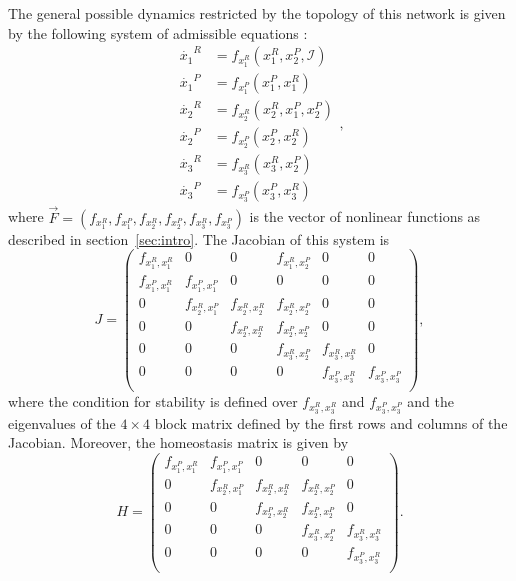 The general possible dynamics restricted by
the topology of this network is given by the following system of 
admissible equations \cite{martin_ian_groupoids2006}:
\begin{equation}
    \begin{aligned}
        \dot{x_1}^R &= f_{x_1^R}(x_1^R, x_2^P, \mathcal{I})\\
        \dot{x_1}^P &= f_{x_1^P}(x_1^P, x_1^R)\\
        \dot{x_2}^R &= f_{x_2^R}(x_2^R, x_1^P, x_2^P)\\
        \dot{x_2}^P &= f_{x_2^P}(x_2^P, x_2^R)\\
        \dot{x_3}^R &= f_{x_3^R}(x_3^R, x_2^P)\\
        \dot{x_3}^P &= f_{x_3^P}(x_3^P, x_3^R)
    \end{aligned},
\end{equation} 
where $\vec{F} = (f_{x_1^R}, f_{x_1^P}, f_{x_2^R}, f_{x_2^P}, 
f_{x_3^R}, f_{x_3^P})$ is 
the vector of nonlinear functions as described in 
section~\ref{sec:intro}. The Jacobian of this system is 
\begin{equation}
    J = 
    \begin{pmatrix}
        f_{x_1^R,x_1^R} & 0 & 0 & f_{x_1^R, x_2^P} & 0 & 0 \\
        f_{x_1^P,x_1^R} & f_{x_1^P,x_1^P} & 0 & 0 & 0 & 0 \\
        0 & f_{x_2^R,x_1^P} & f_{x_2^R,x_2^R} & f_{x_2^R,x_2^P} & 0 & 0 \\
        0 & 0 & f_{x_2^P,x_2^R} & f_{x_2^P,x_2^P} & 0 & 0 \\
        0 & 0 & 0 & f_{x_3^R,x_2^P} & f_{x_3^R,x_3^R} & 0 \\
        0 & 0 & 0 & 0 & f_{x_3^P,x_3^R} & f_{x_3^P,x_3^P} \\
    \end{pmatrix},
\end{equation} 
where the condition for stability is defined over $f_{x_3^R,x_3^R}$
and $f_{x_3^P,x_3^P}$ and the eigenvalues of the $4 \times 4$ 
block matrix defined by the first rows and columns of the Jacobian. 
Moreover, the homeostasis matrix is given by
\begin{equation}
    H = 
    \begin{pmatrix}
        f_{x_1^P,x_1^R} & f_{x_1^P,x_1^P} & 0 & 0 & 0 \\
        0 & f_{x_2^R,x_1^P} & f_{x_2^R,x_2^R} & f_{x_2^R,x_2^P} & 0 \\
        0 & 0 & f_{x_2^P,x_2^R} & f_{x_2^P,x_2^P} & 0 \\
        0 & 0 & 0 & f_{x_3^R,x_2^P} & f_{x_3^R,x_3^R} \\
        0 & 0 & 0 & 0 & f_{x_3^P,x_3^R} \\
    \end{pmatrix}.
\end{equation} 

